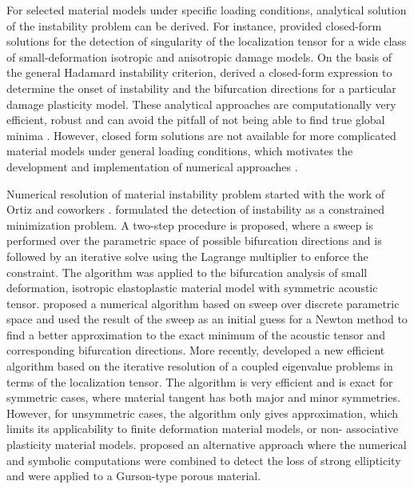 \documentclass[12pt]{article}
\numberwithin{equation}{section}
\begin{document}
For selected material models under specific loading conditions, 
analytical solution of the instability problem can be derived. For 
instance, \citet{Oliver.Huespe:2004} provided closed-form solutions 
for the detection of singularity of the localization tensor for a wide 
class of small-deformation isotropic and anisotropic damage models. On 
the basis of the general Hadamard instability criterion, 
\citet{Xue.Belytschko:2010} derived a closed-form expression to 
determine the onset of instability and the bifurcation directions for 
a particular damage plasticity model. These analytical approaches are 
computationally very efficient, robust and can avoid the pitfall of 
not being able to find true global minima \cite{Oliver.etal:2010}. 
However, closed form solutions are not available for more complicated 
material models under general loading conditions, which motivates the 
development and implementation of numerical approaches 
\cite{Mosler:2005}. 

Numerical resolution of material instability problem started with the 
work of Ortiz and coworkers \cite{Ortiz:1987, Ortiz.etal:1987}. 
\citet{Ortiz.etal:1987} formulated the detection of instability as a 
constrained minimization problem. A two-step procedure is proposed, 
where a sweep is performed over the parametric space of possible 
bifurcation directions and is followed by an iterative solve using the 
Lagrange multiplier to enforce the constraint. The algorithm was 
applied to the bifurcation analysis of small deformation, isotropic 
elastoplastic material model with symmetric acoustic tensor. 
\citet{Mosler:2005} proposed a numerical algorithm based on sweep over 
discrete parametric space and used the result of the sweep as an 
initial guess for a Newton method to find a better approximation to 
the exact minimum of the acoustic tensor and corresponding bifurcation 
directions. More recently, \citet{Oliver.etal:2010} developed a new 
efficient algorithm based on the iterative resolution of a coupled 
eigenvalue problems in terms of the localization tensor. The algorithm 
is very efficient and is exact for symmetric cases, where material 
tangent has both major and minor symmetries. However, for unsymmetric 
cases, the algorithm only gives approximation, which limits its 
applicability to finite deformation material models, or non-
associative plasticity material models. \citet{Boussaa-Aravas:2001} 
proposed an alternative approach where the numerical and symbolic 
computations were combined to detect the loss of strong ellipticity 
and were applied to a Gurson-type porous material.
\end{document}
